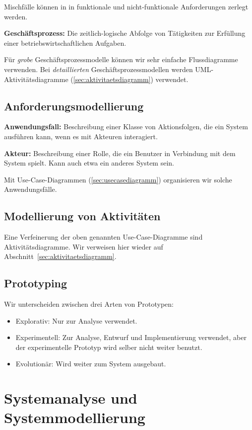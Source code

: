 \documentclass{panikzettel}
\begin{document}
Mischfälle können in in funktionale und nicht-funktionale Anforderungen zerlegt werden.

\textbf{Geschäftsprozess:} Die zeitlich-logische Abfolge von Tätigkeiten zur Erfüllung einer betriebswirtschaftlichen Aufgaben.

Für \emph{grobe} Geschäftsprozessmodelle können wir sehr einfache Flussdiagramme verwenden. Bei \emph{detaillierten} Geschäftsprozessmodellen werden UML-Aktivitätsdiagramme (\ref{sec:aktivitaetsdiagramm}) verwendet.

\subsection{Anforderungsmodellierung}

\textbf{Anwendungsfall:} Beschreibung einer Klasse von Aktionsfolgen, die ein System ausführen kann, wenn es mit Akteuren interagiert.

\textbf{Akteur:} Beschreibung einer Rolle, die ein Benutzer in Verbindung mit dem System spielt. Kann auch etwa ein anderes System sein.

Mit Use-Case-Diagrammen (\ref{sec:usecasediagramm}) organisieren wir solche Anwendungsfälle.

\subsection{Modellierung von Aktivitäten}

Eine Verfeinerung der oben genannten Use-Case-Diagramme sind Aktivitätsdiagramme. Wir verweisen hier wieder auf Abschnitt~\ref{sec:aktivitaetsdiagramm}.

\subsection{Prototyping}

Wir unterscheiden zwischen drei Arten von Prototypen:

\begin{itemize}
\item Explorativ: Nur zur Analyse verwendet.
\item Experimentell: Zur Analyse, Entwurf und Implementierung verwendet, aber der experimentelle Prototyp wird selber nicht weiter benutzt.
\item Evolutionär: Wird weiter zum System ausgebaut.
\end{itemize}

\section{Systemanalyse und Systemmodellierung}
\end{document}
